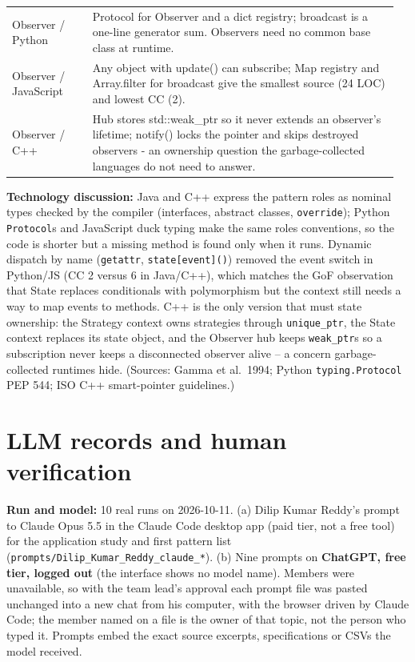 \documentclass[11pt,a4paper]{article}
\begin{document}
\begin{longtable}{@{}P{0.2\linewidth}P{0.76\linewidth}@{}}
Observer / Python & Protocol for Observer and a dict registry; broadcast is a one-line generator sum. Observers need no common base class at runtime. \\
Observer / JavaScript & Any object with update() can subscribe; Map registry and Array.filter for broadcast give the smallest source (24 LOC) and lowest CC (2). \\
Observer / C++ & Hub stores std::weak\_ptr so it never extends an observer's lifetime; notify() locks the pointer and skips destroyed observers - an ownership question the garbage-collected languages do not need to answer. \\
\bottomrule\end{longtable}

\textbf{Technology discussion:} Java and C++ express the pattern roles as nominal types checked by the compiler (interfaces, abstract
classes, \texttt{override}); Python \texttt{Protocol}s and JavaScript duck typing make the same roles conventions, so the code is shorter
but a missing method is found only when it runs. Dynamic dispatch by name (\texttt{getattr}, \texttt{state[event]()}) removed the event
switch in Python/JS (CC 2 versus 6 in Java/C++), which matches the GoF observation that State replaces conditionals with polymorphism but
the context still needs a way to map events to methods. C++ is the only version that must state ownership: the Strategy context owns
strategies through \texttt{unique\_ptr}, the State context replaces its state object, and the Observer hub keeps \texttt{weak\_ptr}s so a
subscription never keeps a disconnected observer alive -- a concern garbage-collected runtimes hide. (Sources: Gamma et al.\ 1994; Python
\texttt{typing.Protocol} PEP 544; ISO C++ smart-pointer guidelines.)

\section{LLM records and human verification}\label{sec:llm}
\textbf{Run and model:} 10 real runs on 2026-10-11. (a) Dilip Kumar Reddy's prompt to Claude Opus 5.5 in the Claude Code desktop app (paid tier,
not a free tool) for the application study and first pattern list (\texttt{prompts/Dilip\_Kumar\_Reddy\_claude\_*}). (b) Nine prompts on
\textbf{ChatGPT, free tier, logged out} (the interface shows no model name). Members were unavailable, so with the team lead's approval each
prompt file was pasted unchanged into a new chat from his computer, with the browser driven by Claude Code; the member named on a file is the
owner of that topic, not the person who typed it. Prompts embed the exact source excerpts, specifications or CSVs the model received.
\end{document}
